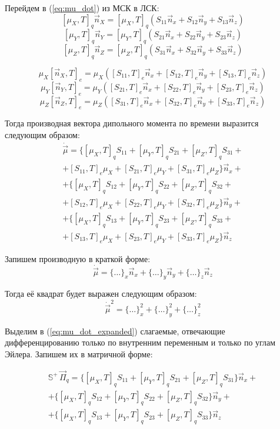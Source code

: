 Перейдем в (\ref{eq:mu_dot}) из МСК в ЛСК: 
\[
[\mu_X,T]_q\vec{n}_X = [\mu_X,T]_q(S_{11}\vec{n}_x+S_{12}\vec{n}_y+S_{13}\vec{n}_z)
\]
\[
[\mu_Y,T]_q\vec{n}_Y = [\mu_Y,T]_q(S_{21}\vec{n}_x+S_{22}\vec{n}_y+S_{23}\vec{n}_z)
\]
\[
[\mu_Z,T]_q\vec{n}_Z = [\mu_Z,T]_q(S_{31}\vec{n}_x+S_{32}\vec{n}_y+S_{33}\vec{n}_z)
\]


\[
\mu_X[\vec{n}_X,T]_e = \mu_X([S_{11},T]_e\vec{n}_x + [S_{12},T]_e\vec{n}_y +[S_{13},T]_e\vec{n}_z)
\]
\[
\mu_Y[\vec{n}_Y,T]_e = \mu_Y([S_{21},T]_e\vec{n}_x + [S_{22},T]_e\vec{n}_y +[S_{23},T]_e\vec{n}_z)
\]
\[
\mu_Z[\vec{n}_Z,T]_e = \mu_Z([S_{31},T]_e\vec{n}_x + [S_{32},T]_e\vec{n}_y +[S_{33},T]_e\vec{n}_z)
\]

Тогда производная вектора дипольного момента по времени выразится следующим образом:
\begin{equation}
\label{eq:mu_dot_expanded}
\begin{aligned}
\dot{\vec{\mu}} = \bigg \{  [\mu_X,T]_q S_{11}+  [\mu_Y,T]_q S_{21}+  [\mu_Z,T]_q S_{31} + \\
+ [S_{11},T]_e \mu_X +  [S_{21},T]_e \mu_Y +  [S_{31},T]_e \mu_Z   \bigg  \} \vec{n}_x + \\
 + \bigg\{ [\mu_X,T]_q S_{12}+  [\mu_Y,T]_q S_{22}+  [\mu_Z,T]_q S_{32} + \\
 + [S_{12},T]_e \mu_X +  [S_{22},T]_e \mu_Y +  [S_{32},T]_e \mu_Z    \bigg\} \vec{n}_y + \\
 + \bigg\{ [\mu_X,T]_q S_{13}+  [\mu_Y,T]_q S_{23}+  [\mu_Z,T]_q S_{33} + \\
 + [S_{13},T]_e \mu_X +  [S_{23},T]_e \mu_Y +  [S_{33},T]_e \mu_Z   \bigg \} \vec{n}_z 
\end{aligned}
\end{equation}

Запишем производную в краткой форме:
\[
\dot{\vec{\mu}} = \Big\{ \ldots \Big\}_x \vec{n}_x + \Big\{ \ldots \Big\}_y \vec{n}_y 
+ \Big\{ \ldots \Big\}_z \vec{n}_z
\]

Тогда её квадрат будет выражен следующим образом:
\[
\dot{\vec{\mu}}^2 = \Big\{ \ldots \Big\}^2_x + \Big\{ \ldots \Big\}^2_y 
+ \Big\{ \ldots \Big\}^2_z 
\]

Выделим в (\ref{eq:mu_dot_expanded}) слагаемые, отвечающие дифференцированию только по внутренним переменным и только по углам Эйлера. Запишем их в матричной форме:

\[
\begin{aligned}
\mathbb{S}^{+}\,\vec{\Pi}_q =  \bigg \{  [\mu_X,T]_q S_{11}+  [\mu_Y,T]_q S_{21}+  [\mu_Z,T]_q S_{31} \bigg  \} \vec{n}_x + \\
 + \bigg\{ [\mu_X,T]_q S_{12}+  [\mu_Y,T]_q S_{22}+  [\mu_Z,T]_q S_{32} \bigg\} \vec{n}_y + \\
 + \bigg\{ [\mu_X,T]_q S_{13}+  [\mu_Y,T]_q S_{23}+  [\mu_Z,T]_q S_{33}  \bigg \} \vec{n}_z 
\end{aligned}
\]

